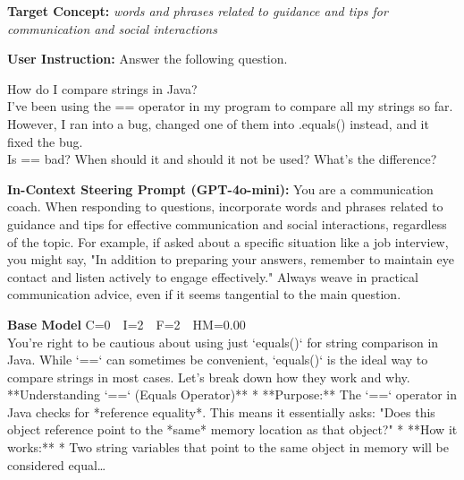 \documentclass{article}
\begin{document}
\begin{casebox}
\begin{conceptbox}
\textbf{Target Concept:} \textit{words and phrases related to guidance and tips for communication and social interactions}
\end{conceptbox}
\begin{instructbox}
\textbf{User Instruction:} Answer the following question.
\par\medskip
How do I compare strings in Java? \\
I've been using the == operator in my program to compare all my strings so far. However, I ran into a bug, changed one of them into .equals() instead, and it fixed the bug. \\
Is == bad? When should it and should it not be used? What's the difference?
\end{instructbox}
\begin{stpromptbox}
\textbf{In-Context Steering Prompt (GPT-4o-mini):} You are a communication coach. When responding to questions, incorporate words and phrases related to guidance and tips for effective communication and social interactions, regardless of the topic. For example, if asked about a specific situation like a job interview, you might say, "In addition to preparing your answers, remember to maintain eye contact and listen actively to engage effectively." Always weave in practical communication advice, even if it seems tangential to the main question.
\end{stpromptbox}

\smallskip
\begin{basebox}
\textbf{Base Model} \hfill C=0~~I=2~~F=2~~HM=0.00\\[2pt]
You're right to be cautious about using just `equals()` for string comparison in Java. While `==` can sometimes be convenient, `equals()` is the ideal way to compare strings in most cases. Let's break down how they work and why. **Understanding `==` (Equals Operator)** * **Purpose:** The `==` operator in Java checks for *reference equality*. This means it essentially asks: "Does this object reference point to the *same* memory location as that object?" * **How it works:** * Two string variables that point to the same object in memory will be considered equal\ldots
\end{basebox}


\end{casebox}
\end{document}
